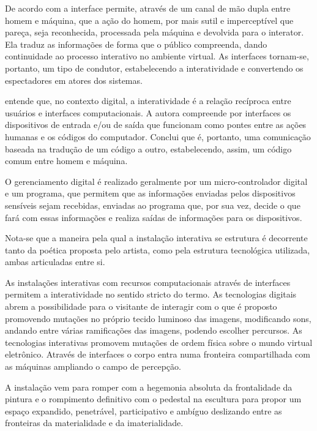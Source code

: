 De acordo com  a interface permite, através de um canal de mão dupla entre homem e máquina, que a ação do homem, por mais sutil e imperceptível que pareça, seja reconhecida, processada pela máquina e devolvida para o interator. Ela traduz as informações de forma que o público compreenda, dando continuidade ao processo interativo no ambiente virtual. As interfaces tornam-se, portanto, um tipo de condutor, estabelecendo a interatividade e convertendo os espectadores em atores dos sistemas. 

 entende que, no contexto digital, a interatividade é a relação recíproca entre usuários e interfaces computacionais. A autora compreende por interfaces os dispositivos de entrada e/ou de saída que funcionam como pontes entre as ações humanas e os códigos do computador. Conclui que é, portanto, uma comunicação baseada na tradução de um código a outro, estabelecendo, assim, um código comum entre homem e máquina. 

O gerenciamento digital é realizado geralmente por um micro-controlador digital e um programa, que permitem que as informações enviadas pelos dispositivos sensíveis sejam recebidas, enviadas ao programa que, por sua vez, decide o que fará com essas informações e realiza saídas de informações para os dispositivos. \cite[p. 66]{sogabe2011}

Nota-se que a maneira pela qual a instalação interativa se estrutura é decorrente tanto da poética proposta pelo artista, como pela estrutura tecnológica utilizada, ambas articuladas entre si. \cite[p. 6-7]{bochio}

As instalações interativas com recursos computacionais através de interfaces permitem
a interatividade no sentido stricto do termo. As tecnologias digitais abrem a
possibilidade para o visitante de interagir com o que é proposto promovendo mutações
no próprio tecido luminoso das imagens, modificando sons, andando entre várias
ramificações das imagens, podendo escolher percursos. As tecnologias interativas
promovem mutações de ordem física sobre o mundo virtual eletrônico. Através de
interfaces o corpo entra numa fronteira compartilhada com as máquinas ampliando o
campo de percepção. \cite{domingues1998}


A instalação vem para romper com a hegemonia absoluta da frontalidade da pintura
e o rompimento definitivo com o pedestal na escultura para propor um espaço expandido,
penetrável, participativo e ambíguo deslizando entre as fronteiras da materialidade
e da imaterialidade. \cite[p. 1130]{semeler2015}

